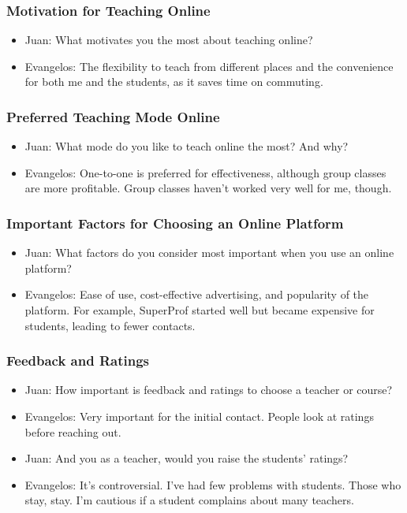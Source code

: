 \begin{enumerate}
\subsubsection*{Motivation for Teaching Online}
\begin{itemize}
\item Juan: What motivates you the most about teaching online?
\item Evangelos: The flexibility to teach from different places and the convenience for both me and the students, as it saves time on commuting.
\end{itemize}

\subsubsection*{Preferred Teaching Mode Online}
\begin{itemize}
\item Juan: What mode do you like to teach online the most?
And why?
\item Evangelos: One-to-one is preferred for effectiveness, although group classes are more profitable.
Group classes haven’t worked very well for me, though.
\end{itemize}

\subsubsection*{Important Factors for Choosing an Online Platform}
\begin{itemize}
\item Juan: What factors do you consider most important when you use an online platform?
\item Evangelos: Ease of use, cost-effective advertising, and popularity of the platform.
For example, SuperProf started well but became expensive for students, leading to fewer contacts.
\end{itemize}

\subsubsection*{Feedback and Ratings}
\begin{itemize}
\item Juan: How important is feedback and ratings to choose a teacher or course?
\item Evangelos: Very important for the initial contact.
People look at ratings before reaching out.
\item Juan: And you as a teacher, would you raise the students' ratings?
\item Evangelos: It’s controversial.
I’ve had few problems with students.
Those who stay, stay.
I’m cautious if a student complains about many teachers.
\end{itemize}


\end{enumerate}
